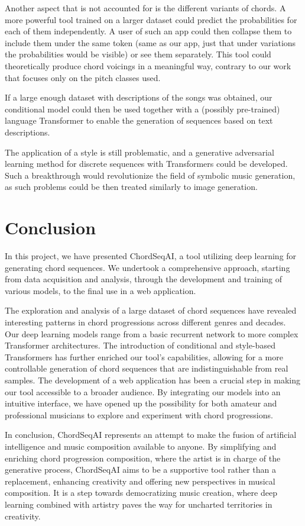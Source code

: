 \documentclass{article}
\begin{document}
Another aspect that is not accounted for is the different variants of chords. A more powerful tool trained on a larger dataset could predict the probabilities for each of them independently. A user of such an app could then collapse them to include them under the same token (same as our app, just that under variations the probabilities would be visible) or see them separately. This tool could theoretically produce chord voicings in a meaningful way, contrary to our work that focuses only on the pitch classes used.

If a large enough dataset with descriptions of the songs was obtained, our conditional model could then be used together with a (possibly pre-trained) language Transformer to enable the generation of sequences based on text descriptions.

The application of a style is still problematic, and a generative adversarial learning method for discrete sequences with Transformers could be developed. Such a breakthrough would revolutionize the field of symbolic music generation, as such problems could be then treated similarly to image generation.

\section{Conclusion}

In this project, we have presented ChordSeqAI, a tool utilizing deep learning for generating chord sequences. We undertook a comprehensive approach, starting from data acquisition and analysis, through the development and training of various models, to the final use in a web application.

The exploration and analysis of a large dataset of chord sequences have revealed interesting patterns in chord progressions across different genres and decades. Our deep learning models range from a basic recurrent network to more complex Transformer architectures. The introduction of conditional and style-based Transformers has further enriched our tool's capabilities, allowing for a more controllable generation of chord sequences that are indistinguishable from real samples. The development of a web application has been a crucial step in making our tool accessible to a broader audience. By integrating our models into an intuitive interface, we have opened up the possibility for both amateur and professional musicians to explore and experiment with chord progressions.

In conclusion, ChordSeqAI represents an attempt to make the fusion of artificial intelligence and music composition available to anyone. By simplifying and enriching chord progression composition, where the artist is in charge of the generative process, ChordSeqAI aims to be a supportive tool rather than a replacement, enhancing creativity and offering new perspectives in musical composition. It is a step towards democratizing music creation, where deep learning combined with artistry paves the way for uncharted territories in creativity.
\end{document}
